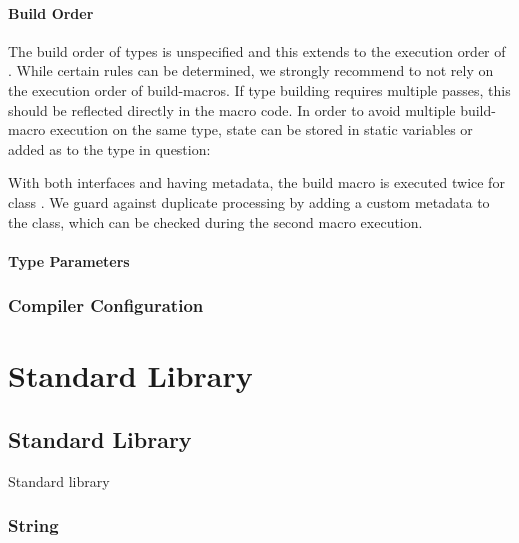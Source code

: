 \documentclass{haxe}
\begin{document}



\subsection{Build Order}
\label{macro-limitations-build-order}

The build order of types is unspecified and this extends to the execution order of . While certain rules can be determined, we strongly recommend to not rely on the execution order of build-macros. If type building requires multiple passes, this should be reflected directly in the macro code. In order to avoid multiple build-macro execution on the same type, state can be stored in static variables or added as  to the type in question:


With both interfaces  and  having  metadata, the build macro is executed twice for class . We guard against duplicate processing by adding a custom  metadata to the class, which can be checked during the second macro execution.


\subsection{Type Parameters}
\label{macro-limitations-type-parameters}


\section{Compiler Configuration}
\label{macro-compiler-configuration}




\part{Standard Library}

\chapter{Standard Library}
\label{std}

Standard library

\section{String}
\label{std-String}
\end{document}
